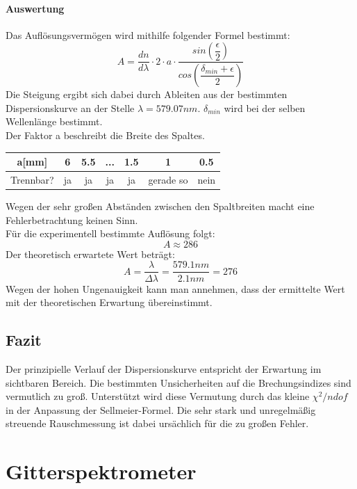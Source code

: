 \documentclass[12pt,a4paper]{article}
\begin{document}
	\paragraph{Auswertung}
	Das Auflösungsvermögen wird mithilfe folgender Formel bestimmt:
	\begin{equation}
	A = \dfrac{dn}{d\lambda}\cdot 2\cdot a\cdot\dfrac{sin\left(\dfrac{\epsilon}{2}\right)}{cos\left(\dfrac{\delta_{min}+\epsilon}{2}\right)}
	\end{equation}
	Die Steigung ergibt sich dabei durch Ableiten aus der bestimmten Dispersionskurve an der Stelle $\lambda = 579.07 nm$. $\delta_{min}$ wird bei der selben Wellenlänge bestimmt.\\
	Der Faktor a beschreibt die Breite des Spaltes.
	\begin{table}
		\begin{tabular}{|c|c|c|c|c|c|c|}
			\hline
			a[mm] & 6 & 5.5 & ... & 1.5 & 1 & 0.5\\
			\hline
			Trennbar? & ja & ja & ja & ja & gerade so & nein\\
			\hline
		\end{tabular}
	\end{table}
	Wegen der sehr großen Abständen zwischen den Spaltbreiten macht eine Fehlerbetrachtung keinen Sinn.\\
	Für die experimentell bestimmte Auflösung folgt:
	\begin{equation}
	A \approx 286
	\end{equation}
	Der theoretisch erwartete Wert beträgt:
	\begin{equation}
	A = \dfrac{\lambda}{\Delta \lambda} = \dfrac{579.1 nm}{2.1 nm} = 276
	\end{equation}
	Wegen der hohen Ungenauigkeit kann man annehmen, dass der ermittelte Wert mit der theoretischen Erwartung übereinstimmt.
	
	
	
	\subsection{Fazit}
	Der prinzipielle Verlauf der Dispersionskurve entspricht der Erwartung im sichtbaren Bereich.
	Die bestimmten Unsicherheiten auf die Brechungsindizes sind vermutlich zu groß. Unterstützt wird diese Vermutung durch das kleine $\chi^2/ndof$ in der Anpassung der Sellmeier-Formel.
	Die sehr stark und unregelmäßig streuende Rauschmessung ist dabei ursächlich für die zu großen Fehler.
	
	
	\newpage
	\section{Gitterspektrometer}
	
\end{document}
